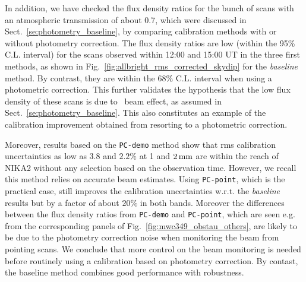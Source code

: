 In addition, we have checked the flux density ratios for the bunch of
scans with an atmospheric transmission of about 0.7, which were
discussed in Sect.~\ref{se:photometry_baseline}, by comparing
calibration methods with or without photometry correction. The
flux density ratios are low (within the 95\% C.L. interval) for the scans
observed within 12:00 and 15:00 UT in the three first methods, as shown in
Fig.~\ref{fig:allbright_rms_corrected_skydip} for
the \emph{baseline} method. By contrast, they are within the 68\% C.L. interval
when using a photometric correction. This further validates the
hypothesis that the low flux
density of these scans is due to \afternoon\ beam effect, as assumed in
Sect.~\ref{se:photometry_baseline}. This also constitutes an example
of the calibration improvement obtained from resorting to a
photometric correction.

Moreover, results based on the {\tt PC-demo} method show that rms
calibration uncertainties as low as $3.8$ and $2.2\%$
at 1 and $2\,\rm{mm}$ are within the reach of NIKA2 {\lp without any
selection based on the observation time.}
However, we recall this method relies on 
accurate beam estimates. Using {\tt PC-point}, which is the
practical case, still improves the calibration uncertainties
w.r.t. the \emph{baseline} results but by a factor of about $20\%$ in both
bands. Moreover the differences between
the flux density ratios from {\tt PC-demo} and {\tt PC-point}, which are
seen e.g. from the corresponding panels of
Fig.~\ref{fig:mwc349_obstau_others}, are likely
to be due to the photometry correction noise
when monitoring the beam from pointing scans. We conclude that more
control on the beam monitoring is needed before routinely using a calibration
based on photometry correction. By contast, the baseline method
combines good performance with robustness.


